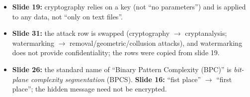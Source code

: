 \begin{fixbox}
\begin{itemize}
  \item \textbf{Slide 19:} cryptography relies on a key (not ``no parameters'') and is applied to any data, not ``only on text files''.
  \item \textbf{Slide 31:} the attack row is swapped (cryptography $\to$ cryptanalysis; watermarking $\to$ removal/geometric/collusion attacks), and watermarking does not provide confidentiality; the rows were copied from slide 19.
  \item \textbf{Slide 26:} the standard name of ``Binary Pattern Complexity (BPC)'' is \emph{bit-plane complexity segmentation} (BPCS). \textbf{Slide 16:} ``fist place'' $\to$ ``first place''; the hidden message need not be encrypted.
\end{itemize}
\end{fixbox}

